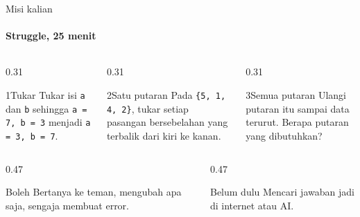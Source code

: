 \documentclass[t]{beamer}
\begin{document}
\begin{frame}{Misi kalian}
\framesubtitle{Struggle, 25 menit}
\begin{columns}[T]
\begin{column}{0.31\textwidth}
\begin{Langkah}{1}{Tukar}
Tukar isi \texttt{a} dan \texttt{b} sehingga \texttt{a = 7, b = 3} menjadi \texttt{a = 3, b = 7}.
\end{Langkah}
\end{column}
\begin{column}{0.31\textwidth}
\begin{Langkah}{2}{Satu putaran}
Pada \texttt{\{5, 1, 4, 2\}}, tukar setiap pasangan bersebelahan yang terbalik dari kiri ke kanan.
\end{Langkah}
\end{column}
\begin{column}{0.31\textwidth}
\begin{Langkah}{3}{Semua putaran}
Ulangi putaran itu sampai data terurut. Berapa putaran yang dibutuhkan?
\end{Langkah}
\end{column}
\end{columns}
\vspace{8pt}
\begin{columns}[T]
\begin{column}{0.47\textwidth}
\begin{Blok}{Boleh}
Bertanya ke teman, mengubah apa saja, sengaja membuat error.
\end{Blok}
\end{column}
\begin{column}{0.47\textwidth}
\begin{BlokAlert}{Belum dulu}
Mencari jawaban jadi di internet atau AI.
\end{BlokAlert}
\end{column}
\end{columns}
\end{frame}
\end{document}
